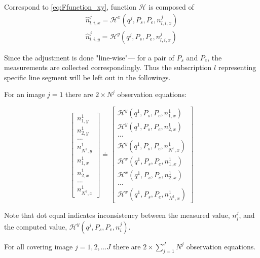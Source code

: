 Correspond to \cref{eq:Ffunction_xy}, function $\mathcal{H}$ is composed of
\begin{equation}
\begin{split}
\hat{n}^j_{l,i,x} = \mathcal{H}^x(q^j,P_s,P_e,n^j_{l,i,x})\\
\hat{n}^j_{l,i,y} = \mathcal{H}^y(q^j,P_s,P_e,n^j_{l,i,x})
\end{split}
\end{equation}

Since the adjustment is done "line-wise"--- for a pair of $P_s$ and $P_e$, the measurements are collected correspondingly. Thus the subscription $l$ representing specific line segment will be left out in the followings.

For an image $j=1$ there are $2\times N^j$ observation equations:

\begin{equation} \label{eq:obs-camera1}
\begin{bmatrix}
n^1_{1,y}\\[0.3em]
n^1_{2,y}\\[0.3em]
...\\[0.3em]
n^1_{N^1,y}\\[0.5em]
n^1_{1,x}\\[0.3em]
n^1_{2,x}\\[0.3em]
...\\[0.3em]
n^1_{N^1,x}
\end{bmatrix}
\doteq %
\begin{bmatrix}
\mathcal{H}^y(q^1,P_s,P_e,n^1_{1,x})\\[0.3em]
\mathcal{H}^y(q^1,P_s,P_e,n^1_{2,x})\\[0.3em]
...\\[0.3em]
\mathcal{H}^y(q^1,P_s,P_e,n^1_{N^1,x})\\[0.5em]
\mathcal{H}^x(q^1,P_s,P_e,n^1_{1,x})\\[0.3em]
\mathcal{H}^x(q^1,P_s,P_e,n^1_{2,x})\\[0.3em]
...\\[0.3em]
\mathcal{H}^x(q^1,P_s,P_e,n^1_{N^1,x})
\end{bmatrix}
\end{equation}

Note that dot equal indicates inconsistency between the measured value, $n^j_i$, and the computed value, $\mathcal{H}^y(q^j,P_s,P_e,n^j_i)$.

For all covering image $j=1,2,...J$ there are $2\times\displaystyle\sum_{j=1}^{J}N^j$ observation equations.

